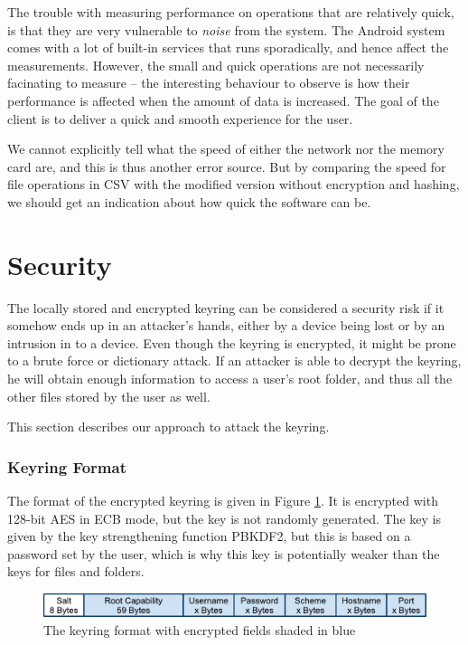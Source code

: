 \documentclass[pdftex,english,10pt,b5paper,twoside]{book}
\begin{document}
The trouble with measuring performance on operations that are relatively quick,
is that they are very vulnerable to \emph{noise} from the system. The Android
system comes with a lot of built-in services that runs sporadically, and hence
affect the measurements. However, the small and quick operations are not
necessarily facinating to measure -- the interesting behaviour to observe is
how their performance is affected when the amount of data is increased. The
goal of the client is to deliver a quick and smooth experience for the user.

We cannot explicitly tell what the speed of either the network nor the memory
card are, and this is thus another error source. But by comparing the speed for
file operations in \ac{CSV} with the modified version without encryption and
hashing, we should get an indication about how quick the software can be.

\section{Security}
\label{sec:BFLK}

The locally stored and encrypted keyring can be considered a security risk if
it somehow ends up in an attacker's hands, either by a device being lost or by
an intrusion in to a device. Even though the keyring is encrypted, it might be
prone to a brute force or dictionary attack. If an attacker is able to decrypt
the keyring, he will obtain enough information to access a user's root folder,
and thus all the other files stored by the user as well.

This section describes our approach to attack the keyring.

\subsubsection{Keyring Format}

The format of the encrypted keyring is given in Figure \ref{fig:KeyringFormat}.
It is encrypted with 128-bit \ac{AES} in \ac{ECB} mode, but the key is not
randomly generated. The key is given by the key strengthening function
\ac{PBKDF2}, but this is based on a password set by the user, which is why this
key is potentially weaker than the keys for files and folders.

\begin{figure}[h!]
    \centering
    \includegraphics[scale=0.6]{KeyringFormat.pdf}
    \caption{The keyring format with encrypted fields shaded in blue}
    \label{fig:KeyringFormat}
\end{figure}
\end{document}
